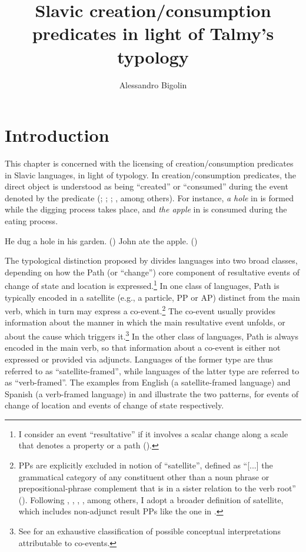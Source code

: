 \documentclass[output=paper,colorlinks,citecolor=brown]{langscibook}
\author{Alessandro Bigolin\orcid{0000-0003-4209-4263}\affiliation{Centre de Lingüística Teòrica, Universitat Autònoma de Barcelona}}
\title{Slavic creation/consumption predicates in light of Talmy's typology}
\begin{document}
\maketitle

%


\section{Introduction}\label{1}

This chapter is concerned with the licensing of creation/consumption predicates in Slavic languages, in light of  typology. In creation/consumption predicates, the direct object is understood as being ``created'' or ``consumed'' during the event denoted by the predicate (\citealt{HaleAndKeyser2002}; \citealt{Volpe2004}; \citealt{Harley2005}; \citealt{Mateu2012}, among others). For instance, \textit{a hole} in  is formed while the digging process takes place, and \textit{the apple} in  is consumed during the eating process.

\ea \label{blaentrambi} \ea He dug a hole in his garden. \label{bla} \hfill (\citealt[46]{Washio1997})
\ex John ate the apple. \label{bla2} \hfill (\citealt[103]{FolliAndHarley2005})
\z \z

\noindent The typological distinction proposed by \citet{Talmy2000} divides languages into two broad classes, depending on how the Path (or ``change'') core component of resultative events of change of state and location is expressed.\footnote{I consider an event ``resultative'' if it involves a scalar change along a scale that denotes a property or a path (\citealt{RappaportHovav2014}).} In one class of languages, Path is typically encoded in a satellite (e.g., a particle, PP or AP) distinct from the main verb, which in turn may express a co-event.\footnote{PPs are explicitly excluded in  notion of ``satellite'', defined as ``[...] the grammatical category of any constituent other than a noun phrase or prepositional-phrase complement that is in a sister relation to the verb root'' (\citealt[120]{Talmy2000}). Following \citet{Mateu2002}, \citet{BeaversLevinandTham2010}, \citet{Acedo-MatellanandMateu2013}, \citet{Acedo-Matellan2016}, among others, I adopt a broader definition of satellite, which includes non-adjunct result PPs like the one in .} The co-event usually provides information about the manner in which the main %
resultative event unfolds, or about the cause which triggers it.\footnote{See \citet{Talmy2000} for an exhaustive classification of possible conceptual interpretations attributable to co-events.} In the other class of languages, Path is always encoded in the main verb, so that information about a co-event is either not expressed or provided via adjuncts. Languages of the former type are thus referred to as ``satellite-framed'', while languages of the latter type are referred to as ``verb-framed''. The examples from English (a satellite-framed language) and Spanish (a verb-framed language) in  and  illustrate the two patterns, for events of change of location and events of change of state respectively.
\end{document}
